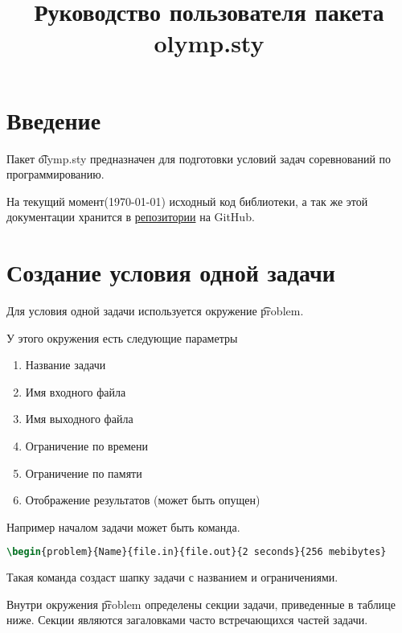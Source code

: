 \documentclass[11pt,a4paper,oneside]{article}
\begin{document}
\newcommand{\giturl}[1]{\href{https://github.com/GassaFM/olymp.sty}{#1}}
\newcommand{\subgiturl}[2]{\href{https://github.com/GassaFM/olymp.sty/#1}{#2}}
\newcommand{\command}[1]{\textbackslash\unskip #1}

\title{Руководство пользователя пакета olymp.sty}
\author{}
\maketitle
\newpage

\section{Введение}

Пакет \t{olymp.sty} предназначен для подготовки условий задач
соревнований по программированию. 

На текущий момент(\today) исходный код библиотеки, а так же
этой документации хранится в \giturl{репозитории} на GitHub.

\section{Создание условия одной задачи}

Для условия одной задачи используется окружение \t{problem}.

У этого окружения есть следующие параметры
\begin{enumerate}
\item Название задачи
\item Имя входного файла
\item Имя выходного файла
\item Ограничение по времени
\item Ограничение по памяти
\item Отображение результатов (может быть опущен)
\end{enumerate}

Например началом задачи может быть команда. 
\begin{lstlisting}[language=tex]
\begin{problem}{Name}{file.in}{file.out}{2 seconds}{256 mebibytes}
\end{lstlisting}
Такая команда создаст шапку задачи с названием и ограничениями.

Внутри окружения \t{problem} определены секции задачи, приведенные в таблице ниже.
Секции являются загаловками часто встречающихся частей задачи.
\end{document}
